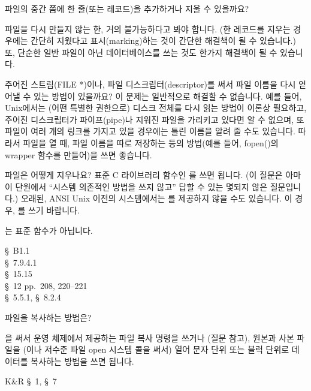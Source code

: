 \begin{faq}
	파일의 중간 쯤에 한 줄(또는 레코드)을 추가하거나 지울 수 있을까요?

\A
	파일을 다시 만들지 않는 한, 거의 불가능하다고 봐야 합니다.
	(한 레코드를 지우는 경우에는 간단히 지웠다고 표시(marking)하는
	것이 간단한 해결책이 될 수 있습니다.)
	또, 단순한 일반 파일이 아닌 데이터베이스를 쓰는 것도
	한가지 해결책이 될 수 있습니다.  
\end{faq}

\begin{faq}
	주어진 스트림(FILE *)이나, 파일 디스크립터(descriptor)를
	써서 파일 이름을 다시 얻어낼 수 있는 방법이 있을까요?
\A
	이 문제는 일반적으로 해결할 수 없습니다.  예를 들어, Unix에서는
	(어떤 특별한 권한으로) 디스크 전체를 다시 읽는 방법이 이론상 필요하고,
	주어진 디스크립터가 파이프(pipe)나 지워진 파일을 가리키고
	있다면 알 수 없으며, 또 파일이 여러 개의 링크를 가지고 있을 경우에는
	틀린 이름을 알려 줄 수도 있습니다.
	따라서 파일을 열 때, 파일 이름을 따로 저장하는 등의 방법(예를 들어,
	fopen()의 wrapper 함수를 만들어)을 쓰면 좋습니다.
\end{faq}

\begin{faq}
	파일은 어떻게 지우나요?
\A
	표준 C 라이브러리 함수인 를 쓰면 됩니다.
	(이 질문은 아마 이 단원에서 ``시스템 의존적인 방법을 쓰지 않고''
	답할 수 있는 몇되지 않은 질문입니다.)
	오래된, ANSI Unix 이전의 시스템에서는 를
	제공하지 않을 수도 있습니다.  이 경우, 를
	쓰기 바랍니다.

\T
	는 표준 함수가 아닙니다.

\R
	\cite{kr2} \S\ B1.1  \\
	\cite{c89} \S\ 7.9.4.1 \\
	\cite{hs} \S\ 15.15  \\
	\cite{pcs} \S\ 12 pp.\ 208, 220--221 \\
	\cite{posix} \S\ 5.5.1, \S\ 8.2.4
\end{faq}

\begin{faq}
	파일을 복사하는 방법은?

\A
	을 써서 운영 체제에서 제공하는 파일 복사 명령을
	쓰거나 (질문  참고), 원본과 사본 파일을 (이나
	저수준 파일 open 시스템 콜을 써서) 열어 문자 단위 또는 블럭 단위로
	데이터를 복사하는 방법을 쓰면 됩니다.

\R
	K\&R \S\ 1, \S\ 7
\end{faq}

